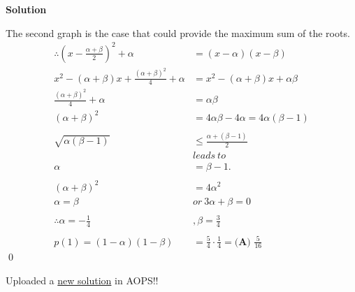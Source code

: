 \documentclass{article}
\newenvironment{solution}{\begin{trivlist}\item[]{\bf Solution}}{\qed \end{trivlist}}
\begin{document}
\begin{solution}
\begin{center}
\end{center}
The second graph is the case that could provide the maximum sum of the roots.
\begin{align*}
    \therefore \left( x - \frac{\alpha + \beta}{2} \right)^2 + \alpha &= (x - \alpha)(x - \beta) \\
    x^2 - (\alpha + \beta)x + \frac{(\alpha + \beta)^2}{4} + \alpha &= x^2 - (\alpha + \beta)x + \alpha\beta \\
    \frac{(\alpha + \beta)^2}{4} + \alpha &= \alpha\beta \\
    (\alpha + \beta)^2 &= 4\alpha\beta - 4\alpha = 4\alpha(\beta - 1)
    \\\\
    \sqrt{\alpha(\beta - 1)} &\le \frac{\alpha + (\beta - 1)}{2} \\
    &leads\ to \\
    \alpha &= \beta - 1.
    \\\\
    (\alpha + \beta)^2 &= 4\alpha^2 \\
    \alpha = \beta\ &or\ 3\alpha + \beta = 0
    \\\\
    \therefore \alpha = -\frac{1}{4}&, \beta = \frac{3}{4}
    \\\\
    p(1) = (1 - \alpha)(1 - \beta) &= \frac{5}{4} \cdot \frac{1}{4} = \boxed{\textbf{(A) } \frac{5}{16}}
\end{align*}
\end{solution}
Uploaded a \href{https://artofproblemsolving.com/wiki/index.php/2021_Fall_AMC_12A_Problems/Problem_23#Solution_11_.28AM-GM_Inequality.29}{new solution} in AOPS!! \\
\end{document}

